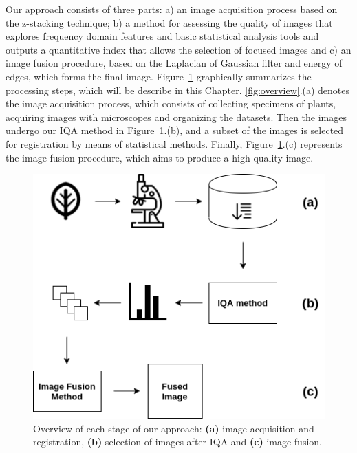 Our approach consists of three parts: a) an image acquisition process based on the z-stacking technique; b) a method for assessing the quality of images that explores frequency domain features and basic statistical analysis tools and outputs a quantitative index that allows the selection of focused images and c) an image fusion procedure, based on the Laplacian of Gaussian filter and energy of edges, which forms the final image. Figure~\ref{fig:overview} graphically summarizes the processing steps, which will be describe in this Chapter. \autoref{fig:overview}.(a) denotes the image acquisition process, which consists of collecting specimens of plants, acquiring images with microscopes and organizing the datasets. Then the images undergo our IQA method in Figure~\ref{fig:overview}.(b), and a subset of the images is selected for registration by means of statistical methods. Finally, Figure~\ref{fig:overview}.(c) represents the image fusion procedure, which aims to produce a high-quality image.

\begin{figure}[ht]
  \centering
  \caption{Overview of each stage of our approach: \textbf{(a)} image acquisition and registration, \textbf{(b)} selection of images after IQA and \textbf{(c)} image fusion.}
  \label{fig:overview}
  \includegraphics[scale=0.8]{images/overview.png}
  \centering
  \fautor
\end{figure}
